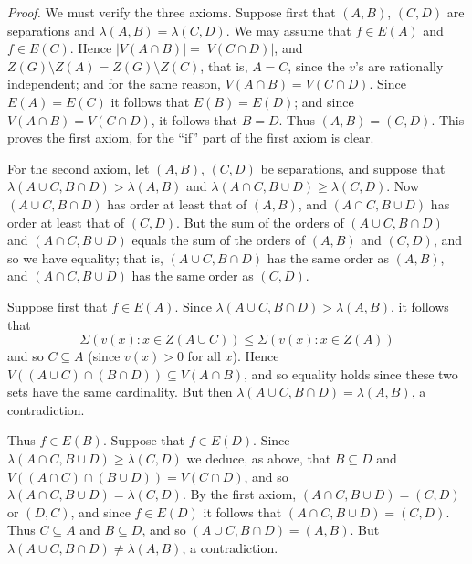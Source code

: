 \textit{Proof.} We must verify the three axioms. Suppose first that $(A, B)$, $(C, D)$ are separations and $\lambda(A, B) = \lambda(C, D)$. We may assume that $f \in E(A)$ and $f \in E(C)$. Hence $|V(A \cap B)| = |V(C \cap D)|$, and $Z(G) \setminus Z(A) = Z(G) \setminus Z(C)$, that is, $A = C$, since the $v$'s are rationally independent; and for the same reason, $V(A \cap B) = V(C \cap D)$. Since $E(A) = E(C)$ it follows that $E(B) = E(D)$; and since $V(A \cap B) = V(C \cap D)$, it follows that $B = D$. Thus $(A, B) = (C, D)$. This proves the first axiom, for the ``if'' part of the first axiom is clear.

For the second axiom, let $(A, B)$, $(C, D)$ be separations, and suppose that $\lambda(A \cup C, B \cap D) > \lambda(A, B)$ and $\lambda(A \cap C, B \cup D) \ge \lambda(C, D)$. Now $(A \cup C, B \cap D)$ has order at least that of $(A, B)$, and $(A \cap C, B \cup D)$ has order at least that of $(C, D)$. But the sum of the orders of $(A \cup C, B \cap D)$ and $(A \cap C, B \cup D)$ equals the sum of the orders of $(A, B)$ and $(C, D)$, and so we have equality; that is, $(A \cup C, B \cap D)$ has the same order as $(A, B)$, and $(A \cap C, B \cup D)$ has the same order as $(C, D)$.

Suppose first that $f \in E(A)$. Since $\lambda(A \cup C, B \cap D) > \lambda(A, B)$, it follows that
\begin{equation*}
\Sigma(v(x) : x \in Z(A \cup C)) \le \Sigma(v(x) : x \in Z(A))
\end{equation*}
and so $C \subseteq A$ (since $v(x) > 0$ for all $x$). Hence $V((A \cup C) \cap (B \cap D)) \subseteq V(A \cap B)$, and so equality holds since these two sets have the same cardinality. But then $\lambda(A \cup C, B \cap D) = \lambda(A, B)$, a contradiction.

Thus $f \in E(B)$. Suppose that $f \in E(D)$. Since $\lambda(A \cap C, B \cup D) \ge \lambda(C, D)$ we deduce, as above, that $B \subseteq D$ and $V((A \cap C) \cap (B \cup D)) = V(C \cap D)$, and so $\lambda(A \cap C, B \cup D) = \lambda(C, D)$. By the first axiom, $(A \cap C, B \cup D) = (C, D)$ or $(D, C)$, and since $f \in E(D)$ it follows that $(A \cap C, B \cup D) = (C, D)$. Thus $C \subseteq A$ and $B \subseteq D$, and so $(A \cup C, B \cap D) = (A, B)$. But $\lambda(A \cup C, B \cap D) \ne \lambda(A, B)$, a contradiction.

